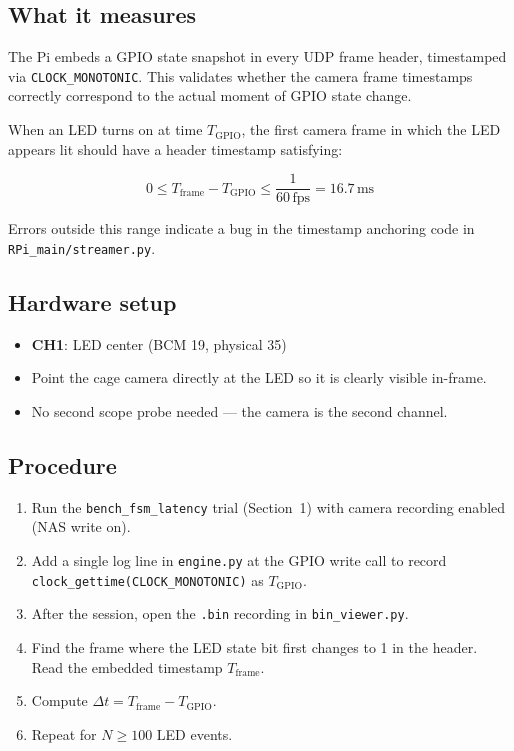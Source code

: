 \documentclass[11pt, a4paper]{article}
\begin{document}
\subsection*{What it measures}

The Pi embeds a GPIO state snapshot in every UDP frame header, timestamped via
\texttt{CLOCK\_MONOTONIC}. This validates whether the camera frame timestamps
correctly correspond to the actual moment of GPIO state change.

When an LED turns on at time $T_\text{GPIO}$, the first camera frame in which
the LED appears lit should have a header timestamp satisfying:

\[
0 \leq T_\text{frame} - T_\text{GPIO} \leq \frac{1}{60\,\text{fps}} = 16.7\,\text{ms}
\]

Errors outside this range indicate a bug in the timestamp anchoring code in
\texttt{RPi\_main/streamer.py}.

\subsection*{Hardware setup}

\begin{itemize}[noitemsep]
    \item \textbf{CH1}: LED center (BCM 19, physical 35)
    \item Point the cage camera directly at the LED so it is clearly visible
          in-frame.
    \item No second scope probe needed --- the camera is the second channel.
\end{itemize}

\subsection*{Procedure}

\begin{enumerate}[noitemsep]
    \item Run the \texttt{bench\_fsm\_latency} trial (Section~1) with camera
          recording enabled (NAS write on).
    \item Add a single log line in \texttt{engine.py} at the GPIO write call to
          record \texttt{clock\_gettime(CLOCK\_MONOTONIC)} as $T_\text{GPIO}$.
    \item After the session, open the \texttt{.bin} recording in
          \texttt{bin\_viewer.py}.
    \item Find the frame where the LED state bit first changes to 1 in the header.
          Read the embedded timestamp $T_\text{frame}$.
    \item Compute $\Delta t = T_\text{frame} - T_\text{GPIO}$.
    \item Repeat for $N \geq 100$ LED events.
\end{enumerate}
\end{document}
